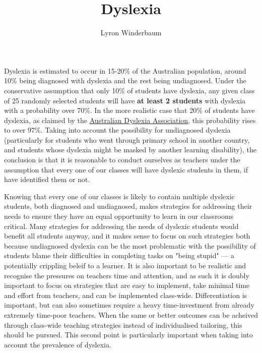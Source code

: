 \documentclass[17pt]{memoir}
\title{Dyslexia}
\author{Lyron Winderbaum}
\begin{document}
\maketitle



Dyslexia is estimated to occur in 15-20\% of the Australian population, around 10\% being diagnosed with dyslexia and the rest being undiagnosed. Under the conservative assumption that only 10\% of students have dyslexia, any given class of 25 randomly selected students will have \textbf{at least 2 students} with dyslexia with a probability over 70\%. In the more realistic case that 20\% of students have dyslexia, as claimed by the \href{https://dyslexiaassociation.org.au/dyslexia-in-australia/}{Australian Dyslexia Association}, this probability rises to over 97\%. Taking into account the possibility for undiagnosed dyslexia (particularly for students who went through primary school in another country, and students whose dyslexia might be masked by another learning disability), the conclusion is that it is reasonable to conduct ourselves as teachers under the assumption that every one of our classes will have dyslexic students in them, if have identified them or not. 

Knowing that every one of our classes is likely to contain multiple dyslexic students, both diagnosed and undiagnosed, makes strategies for addressing their needs to ensure they have an equal opportunity to learn in our classrooms critical. Many strategies for addressing the needs of dyslexic students would benefit all students anyway, and it makes sense to focus on such strategies both because undiagnosed dyslexia can be the most problematic with the possibility of students blame their difficulties in completing tasks on "being stupid" --- a potentially crippling beleif to a learner. It is also important to be realistic and recognise the pressures on teachers time and attention, and as such it is doubly important to focus on strategies that are easy to implement, take minimal time and effort from teachers, and can be implemented class-wide. Differentiation is important, but can also sometimes require a heavy time-investment from already extremely time-poor teachers. When the same or better outcomes can be acheived through class-wide teaching strategies instead of individualised tailoring, this should be pursued. This second point is particularly important when taking into account the prevalence of dyslexia.
\end{document}
